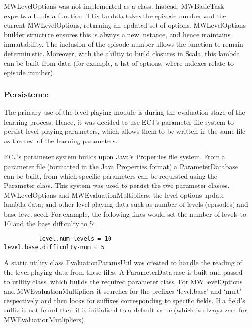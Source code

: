 MWLevelOptions was not implemented as a class. Instead, MWBasicTask expects a lambda function. This lambda takes the episode number and the current MWLevelOptions, returning an updated set of options. MWLevelOptions builder structure ensures this is always a new instance, and hence maintains immutability. The inclusion of the episode number allows the function to remain deterministic. Moreover, with the ability to build closures in Scala, this lambda can be built from data (for example, a list of options, where indexes relate to episode number).

\subsubsection{Persistence}
\label{subsec:evalparams}

The primary use of the level playing module is during the evaluation stage of the learning process. Hence, it was decided to use ECJ's parameter file system to persist level playing parameters, which allows them to be written in the same file as the rest of the learning parameters.

ECJ's parameter system builds upon Java's Properties file system. From a parameter file (formatted in the Java Properties format) a ParameterDatabase can be built, from which specific parameters can be requested using the Parameter class. This system was used to persist the two parameter classes, MWLevelOptions and MWEvaluationMultipliers; the level options update lambda data; and other level playing data such as number of levels (episodes) and base level seed. For example, the following lines would set the number of levels to 10 and the base difficulty to 5:

\begin{minipage}{0.9\linewidth}
\centering
\begin{lstlisting}
          level.num-levels = 10
level.base.difficulty-num = 5
\end{lstlisting}
\end{minipage}

A static utility class EvaluationParamsUtil was created to handle the reading of the level playing data from these files. A ParameterDatabase is built and passed to utility class, which builds the required parameter class. For MWLevelOptions and MWEvaluationMultipliers it searches for the prefixes `{\ttfamily level.base}' and `{\ttfamily mult}' respectively and then looks for suffixes corresponding to specific fields. If a field's suffix is not found then it is initialised to a default value (which is always zero for MWEvaluationMutlipliers).

